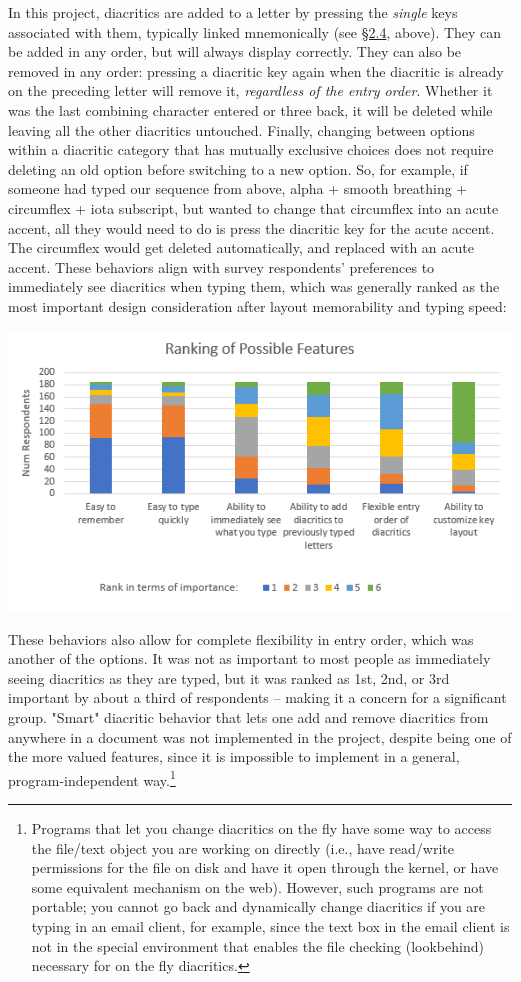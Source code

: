 \documentclass[11pt]{article}
\begin{document}
In this project, diacritics are added to a letter by pressing the \emph{single} keys associated with them, typically linked mnemonically (see \hyperref[sec:org7079960]{§2.4}, above). They can be added in any order, but will always display correctly. They can also be removed in any order: pressing a diacritic key again when the diacritic is already on the preceding letter will remove it, \emph{regardless of the entry order}. Whether it was the last combining character entered or three back, it will be deleted while leaving all the other diacritics untouched. Finally, changing between options within a diacritic category that has mutually exclusive choices does not require deleting an old option before switching to a new option. So, for example, if someone had typed our sequence from above, alpha + smooth breathing + circumflex + iota subscript, but wanted to change that circumflex into an acute accent, all they would need to do is press the diacritic key for the acute accent. The circumflex would get deleted automatically, and replaced with an acute accent. These behaviors align with survey respondents' preferences to immediately see diacritics when typing them, which was generally ranked as the most important design consideration after layout memorability and typing speed:

\begin{center}
\includegraphics[width=.9\linewidth]{./images/ranking-of-possible-features.PNG}
\end{center}

These behaviors also allow for complete flexibility in entry order, which was another of the options. It was not as important to most people as immediately seeing diacritics as they are typed, but it was ranked as 1st, 2nd, or 3rd important by about a third of respondents -- making it a concern for a significant group. "Smart" diacritic behavior that lets one add and remove diacritics from anywhere in a document was not implemented in the project, despite being one of the more valued features, since it is impossible to implement in a general, program-independent way.\footnote{Programs that let you change diacritics on the fly have some way to access the file/text object you are working on directly (i.e., have read/write permissions for the file on disk and have it open through the kernel, or have some equivalent mechanism on the web). However, such programs are not portable; you cannot go back and dynamically change diacritics if you are typing in an email client, for example, since the text box in the email client is not in the special environment that enables the file checking (lookbehind) necessary for on the fly diacritics.}
\end{document}

